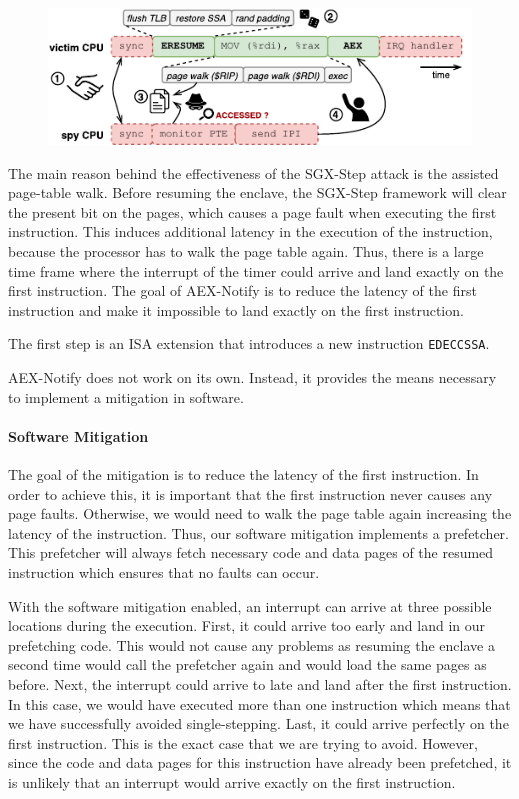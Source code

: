 \documentclass{llncs}
\begin{document}
\begin{figure}[t]
  \centering
  \includegraphics{images/sgx-step-pte.pdf}
  \caption{}
  \label{fig:sgx-step-pte}
\end{figure}

The main reason behind the effectiveness of the SGX-Step attack is the assisted
page-table walk.
Before resuming the enclave, the SGX-Step framework will clear the present bit
on the pages, which causes a page fault when executing the first instruction.
This induces additional latency in the execution of the instruction, because
the processor has to walk the page table again.
Thus, there is a large time frame where the interrupt of the timer could
arrive and land exactly on the first instruction.
The goal of AEX-Notify is to reduce the latency of the first instruction
and make it impossible to land exactly on the first instruction.

The first step is an ISA extension that introduces a new instruction \texttt{EDECCSSA}.

AEX-Notify does not work on its own.
Instead, it provides the means necessary to implement a mitigation in software.

\paragraph{Software Mitigation}
The goal of the mitigation is to reduce the latency of the first instruction.
In order to achieve this, it is important that the first instruction never causes any page faults.
Otherwise, we would need to walk the page table again increasing the latency of the instruction.
Thus, our software mitigation implements a prefetcher.
This prefetcher will always fetch necessary code and data pages of the resumed
instruction which ensures that no faults can occur.

With the software mitigation enabled, an interrupt can arrive at three possible
locations during the execution.
First, it could arrive too early and land in our prefetching code.
This would not cause any problems as resuming the enclave a second time would
call the prefetcher again and would load the same pages as before.
Next, the interrupt could arrive to late and land after the first instruction.
In this case, we would have executed more than one instruction which means
that we have successfully avoided single-stepping.
Last, it could arrive perfectly on the first instruction.
This is the exact case that we are trying to avoid.
However, since the code and data pages for this instruction have already been prefetched,
it is unlikely that an interrupt would arrive exactly on the first instruction.
  
\end{document}
